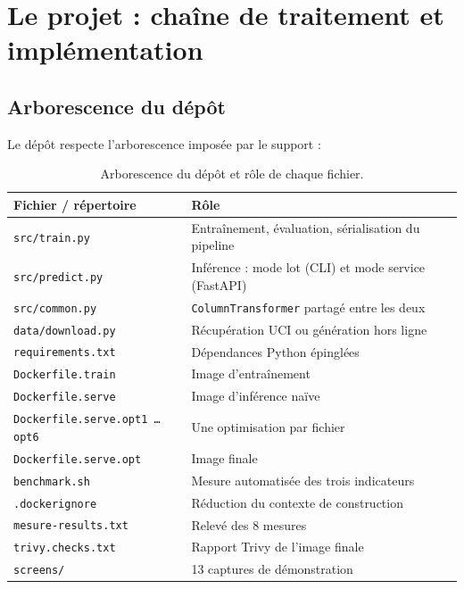\documentclass[11pt,a4paper]{report}
\begin{document}
\chapter{Le projet : chaîne de traitement et implémentation}

\section{Arborescence du dépôt}

Le dépôt respecte l'arborescence imposée par le support :

\begin{table}[H]
\centering\small
\begin{tabular}{@{}p{5.4cm}p{8.6cm}@{}}
\toprule
\textbf{Fichier / répertoire} & \textbf{Rôle} \\
\midrule
\texttt{src/train.py}     & Entraînement, évaluation, sérialisation du pipeline \\
\texttt{src/predict.py}   & Inférence : mode lot (CLI) et mode service (FastAPI) \\
\texttt{src/common.py}    & \texttt{ColumnTransformer} partagé entre les deux \\
\texttt{data/download.py} & Récupération UCI ou génération hors ligne \\
\texttt{requirements.txt} & Dépendances Python épinglées \\
\texttt{Dockerfile.train} & Image d'entraînement \\
\texttt{Dockerfile.serve} & Image d'inférence naïve \\
\texttt{Dockerfile.serve.opt1 \dots opt6} & Une optimisation par fichier \\
\texttt{Dockerfile.serve.opt} & Image finale \\
\texttt{benchmark.sh}     & Mesure automatisée des trois indicateurs \\
\texttt{.dockerignore}    & Réduction du contexte de construction \\
\texttt{mesure-results.txt} & Relevé des 8 mesures \\
\texttt{trivy.checks.txt} & Rapport Trivy de l'image finale \\
\texttt{screens/}         & 13 captures de démonstration \\
\bottomrule
\end{tabular}
\caption{Arborescence du dépôt et rôle de chaque fichier.}
\end{table}
\end{document}
